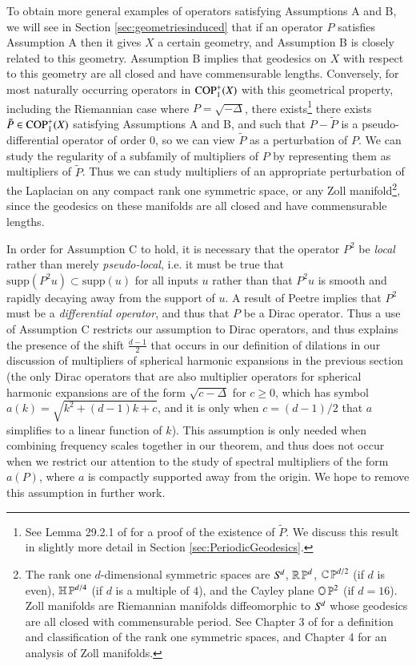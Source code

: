 To obtain more general examples of operators satisfying Assumptions A and B, we will see in Section \ref{sec:geometriesinduced} that if an operator $P$ satisfies Assumption A then it gives $X$ a certain geometry, and Assumption B is closely related to this geometry. Assumption B implies that geodesics on $X$ with respect to this geometry are all closed and have commensurable lengths. Conversely, for most naturally occurring operators in ${\text{COP}^{+}_{{1}}}(X)$ with this geometrical property, including the Riemannian case where $P = \sqrt{-\Delta}$, there exists\footnote{See Lemma 29.2.1 of \cite{Hormander4} for a proof of the existence of $\tilde{P}$. We discuss this result in slightly more detail in Section \ref{sec:PeriodicGeodesics}.} there exists $\tilde{P} \in {\text{COP}^{+}_{{1}}}(X)$ satisfying Assumptions A and B, and such that $P - \tilde{P}$ is a pseudo-differential operator of order $0$, so we can view $\tilde{P}$ as a perturbation of $P$. We can study the regularity of a subfamily of multipliers of $P$ by representing them as multipliers of $\tilde{P}$. Thus we can study multipliers of an appropriate perturbation of the Laplacian on any compact rank one symmetric space, or any Zoll manifold\footnote{The rank one $d$-dimensional symmetric spaces are ${S}^{\!{d}}$, $\operatorname{\mathbb{R}} \operatorname{\mathbb{P}}^d$, $\operatorname{\mathbb{C}} \operatorname{\mathbb{P}}^{d/2}$ (if $d$ is even), $\mathbb{H} \operatorname{\mathbb{P}}^{d/4}$ (if $d$ is a multiple of $4$), and the Cayley plane $\mathbb{O} \operatorname{\mathbb{P}}^2$ (if $d = 16$). Zoll manifolds are Riemannian manifolds diffeomorphic to ${S}^{\!{d}}$ whose geodesics are all closed with commensurable period. See Chapter 3 of \cite{Besse} for a definition and classification of the rank one symmetric spaces, and Chapter 4 for an analysis of Zoll manifolds.}, since the geodesics on these manifolds are all closed and have commensurable lengths.

In order for Assumption C to hold, it is necessary that the operator $P^2$ be \emph{local} rather than merely \emph{pseudo-local}, i.e. it must be true that $\text{supp}(P^2u) \subset \text{supp}(u)$ for all inputs $u$ rather than that $P^2u$ is smooth and rapidly decaying away from the support of $u$. A result of Peetre \cite{PeetreDiff} implies that $P^2$ must be a \emph{differential operator}, and thus that $P$ be a Dirac operator. Thus a use of Assumption C restricts our assumption to Dirac operators, and thus explains the presence of the shift $\tfrac{d-1}{2}$ that occurs in our definition of dilations in our discussion of multipliers of spherical harmonic expansions in the previous section (the only Dirac operators that are also multiplier operators for spherical harmonic expansions are of the form $\sqrt{ c - \Delta }$ for $c \geq 0$, which has symbol $a(k) = \sqrt{ k^2 + (d-1) k + c }$, and it is only when $c = (d-1)/2$ that $a$ simplifies to a linear function of $k$). This assumption is only needed when combining frequency scales together in our theorem, and thus does not occur when we restrict our attention to the study of spectral multipliers of the form $a(P)$, where $a$ is compactly supported away from the origin. We hope to remove this assumption in further work.

